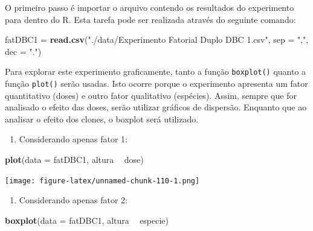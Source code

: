 \documentclass[
]{article}
\newenvironment{Shaded}{\begin{snugshade}}{\end{snugshade}}
\newcommand{\DataTypeTok}[1]{\textcolor[rgb]{0.13,0.29,0.53}{#1}}
\newcommand{\KeywordTok}[1]{\textcolor[rgb]{0.13,0.29,0.53}{\textbf{#1}}}
\newcommand{\NormalTok}[1]{#1}
\newcommand{\OperatorTok}[1]{\textcolor[rgb]{0.81,0.36,0.00}{\textbf{#1}}}
\newcommand{\StringTok}[1]{\textcolor[rgb]{0.31,0.60,0.02}{#1}}
\providecommand{\tightlist}{%
  \setlength{\itemsep}{0pt}\setlength{\parskip}{0pt}}
\begin{document}
O primeiro passo é importar o arquivo contendo os resultados do experimento para dentro do R. Esta tarefa pode ser realizada através do seguinte comando:

\begin{Shaded}
\begin{Highlighting}[]
\NormalTok{fatDBC1 =}\StringTok{ }\KeywordTok{read.csv}\NormalTok{(}\StringTok{"./data/Experimento Fatorial Duplo DBC 1.csv"}\NormalTok{, }
                   \DataTypeTok{sep =} \StringTok{","}\NormalTok{, }\DataTypeTok{dec =} \StringTok{"."}\NormalTok{)}
\end{Highlighting}
\end{Shaded}

Para explorar este experimento graficamente, tanto a função \texttt{boxplot()} quanto a função \texttt{plot()} serão usadas. Isto ocorre porque o experimento apresenta um fator quantitativo (doses) e outro fator qualitativo (espécies). Assim, sempre que for analisado o efeito das doses, serão utilizar gráficos de dispersão. Enquanto que ao analisar o efeito dos clones, o boxplot será utilizado.

\begin{enumerate}
\def\labelenumi{\arabic{enumi}.}
\tightlist
\item
  Considerando apenas fator 1:
\end{enumerate}

\begin{Shaded}
\begin{Highlighting}[]
\KeywordTok{plot}\NormalTok{(}\DataTypeTok{data =}\NormalTok{ fatDBC1, altura }\OperatorTok{~}\StringTok{ }\NormalTok{dose)}
\end{Highlighting}
\end{Shaded}

\texttt{[image: figure-latex/unnamed-chunk-110-1.png]}

\begin{enumerate}
\def\labelenumi{\arabic{enumi}.}
\setcounter{enumi}{1}
\tightlist
\item
  Considerando apenas fator 2:
\end{enumerate}

\begin{Shaded}
\begin{Highlighting}[]
\KeywordTok{boxplot}\NormalTok{(}\DataTypeTok{data =}\NormalTok{ fatDBC1, altura }\OperatorTok{~}\StringTok{ }\NormalTok{especie)}
\end{Highlighting}
\end{Shaded}
\end{document}

